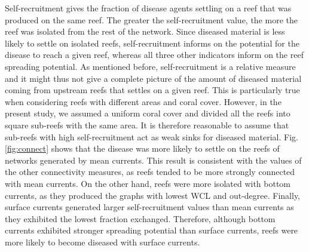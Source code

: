Self-recruitment gives the fraction of disease agents settling on a reef that was produced on the same reef. The greater the self-recruitment value, the more the reef was isolated from the rest of the network. Since diseased material is less likely to settle on isolated reefs, self-recruitment informs on the potential for the disease to reach a given reef, whereas all three other indicators inform on the reef spreading potential. As mentioned before, self-recruitment is a relative measure and it might thus not give a complete picture of the amount of diseased material coming from upstream reefs that settles on a given reef. This is particularly true when considering reefs with different areas and coral cover. However, in the present study, we assumed a uniform coral cover and divided all the reefs into square sub-reefs with the same area. It is therefore reasonable to assume that sub-reefs with high self-recruitment act as weak sinks for diseased material. Fig. \ref{fig:connect} shows that the disease was more likely to settle on the reefs of networks generated by mean currents. This result is consistent with the values of the other connectivity measures, as reefs tended to be more strongly connected with mean currents. On the other hand, reefs were more isolated with bottom currents, as they produced the graphs with lowest WCL and out-degree. Finally, surface currents generated larger self-recruitment values than mean currents as they exhibited the lowest fraction exchanged. Therefore, although bottom currents exhibited stronger spreading potential than surface currents, reefs were more likely to become diseased with surface currents.


